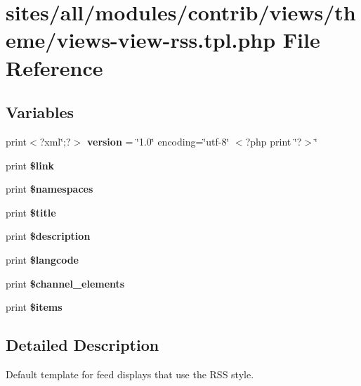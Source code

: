 \hypertarget{views-view-rss_8tpl_8php}{
\section{sites/all/modules/contrib/views/theme/views-view-rss.tpl.php File Reference}
\label{views-view-rss_8tpl_8php}
}
\subsection*{Variables}
\begin{CompactItemize}
\item 
\hypertarget{views-view-rss_8tpl_8php_69dd99931bb815569a5a340a35b5b978}{
print$<$?xml\char`\"{};?$>$ \textbf{version} = \char`\"{}1.0\char`\"{} encoding=\char`\"{}utf-8\char`\"{} $<$?php print \char`\"{}?$>$\char`\"{}}
\label{views-view-rss_8tpl_8php_69dd99931bb815569a5a340a35b5b978}

\item 
\hypertarget{views-view-rss_8tpl_8php_a6dcf0b94d1bbabe3406acb25a24f3f3}{
print \textbf{\$link}}
\label{views-view-rss_8tpl_8php_a6dcf0b94d1bbabe3406acb25a24f3f3}

\item 
\hypertarget{views-view-rss_8tpl_8php_dc02370abfe7f2f4e616d84f359041de}{
print \textbf{\$namespaces}}
\label{views-view-rss_8tpl_8php_dc02370abfe7f2f4e616d84f359041de}

\item 
\hypertarget{views-view-rss_8tpl_8php_ec2795512d255332f57cacd930a090b4}{
print \textbf{\$title}}
\label{views-view-rss_8tpl_8php_ec2795512d255332f57cacd930a090b4}

\item 
\hypertarget{views-view-rss_8tpl_8php_6f52c29993b17bf2650a9337fb56d41d}{
print \textbf{\$description}}
\label{views-view-rss_8tpl_8php_6f52c29993b17bf2650a9337fb56d41d}

\item 
\hypertarget{views-view-rss_8tpl_8php_3403807573a8f6376a368255ccbc8602}{
print \textbf{\$langcode}}
\label{views-view-rss_8tpl_8php_3403807573a8f6376a368255ccbc8602}

\item 
\hypertarget{views-view-rss_8tpl_8php_98613013ad3494e1668b0d25eb37d9d9}{
print \textbf{\$channel\_\-elements}}
\label{views-view-rss_8tpl_8php_98613013ad3494e1668b0d25eb37d9d9}

\item 
\hypertarget{views-view-rss_8tpl_8php_659f315cdf7f7836d272d803af1dda46}{
print \textbf{\$items}}
\label{views-view-rss_8tpl_8php_659f315cdf7f7836d272d803af1dda46}

\end{CompactItemize}


\subsection{Detailed Description}
Default template for feed displays that use the RSS style. 